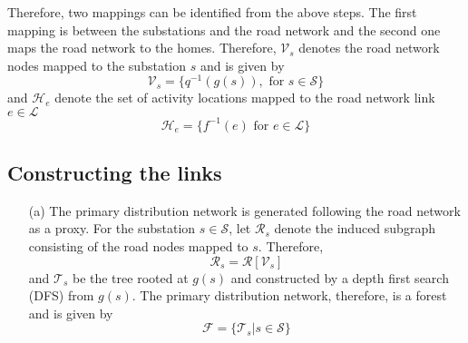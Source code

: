 \documentclass[12pt]{article}
\begin{document}
	Therefore, two mappings can be identified from the above steps. The first mapping is between the substations and the road network and the second one maps the road network to the homes. Therefore, $\mathcal{V}_s$ denotes the road network nodes mapped to the substation $s$ and is given by
	\begin{equation}\mathcal{V}_s=\{q^{-1}(g(s)),\textrm{ for }s\in\mathcal{S}\}\end{equation}
	and $\mathcal{H}_e$ denote the set of activity locations mapped to the road network link $e\in\mathcal{L}$
	\begin{equation}\mathcal{H}_e=\{f^{-1}(e)\textrm{ for }e\in\mathcal{L}\}\end{equation}
	\subsection{Constructing the links}\label{subsec:link}
	\begin{enumerate}
		\item[(a)] The primary distribution network is generated following the road network as a proxy. For the substation $s\in\mathcal{S}$, let $\mathcal{R}_s$ denote the induced subgraph consisting of the road nodes mapped to $s$. Therefore,
		\begin{equation}\mathcal{R}_s=\mathcal{R}[\mathcal{V}_s]\end{equation}
		and $\mathcal{T}_s$ be the tree rooted at $g(s)$ and constructed by a depth first search (DFS) from $g(s)$. The primary distribution network, therefore, is a forest and is given by
		\begin{equation}\mathcal{F}=\{\mathcal{T}_s|s\in\mathcal{S}\}\end{equation}
	\end{enumerate}
\end{document}
